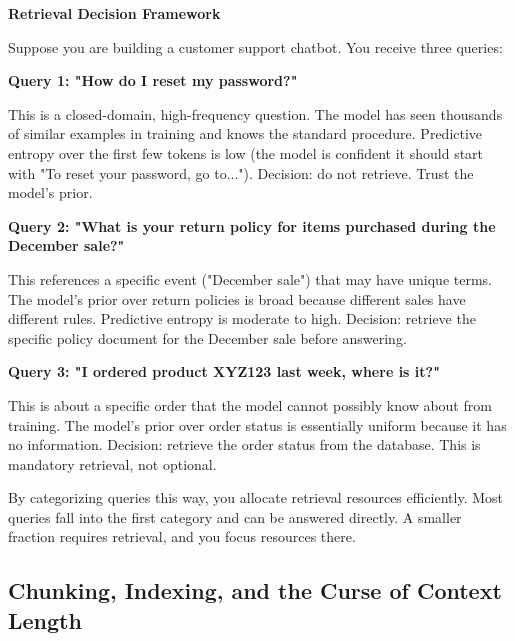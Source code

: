 \begin{examplebox}
\textbf{Retrieval Decision Framework}

\vspace{0.5em}

Suppose you are building a customer support chatbot. You receive three queries:

\vspace{0.5em}

\textbf{Query 1: "How do I reset my password?"}

This is a closed-domain, high-frequency question. The model has seen thousands of similar examples in training and knows the standard procedure. Predictive entropy over the first few tokens is low (the model is confident it should start with "To reset your password, go to..."). Decision: do not retrieve. Trust the model's prior.

\vspace{0.5em}

\textbf{Query 2: "What is your return policy for items purchased during the December sale?"}

This references a specific event ("December sale") that may have unique terms. The model's prior over return policies is broad because different sales have different rules. Predictive entropy is moderate to high. Decision: retrieve the specific policy document for the December sale before answering.

\vspace{0.5em}

\textbf{Query 3: "I ordered product XYZ123 last week, where is it?"}

This is about a specific order that the model cannot possibly know about from training. The model's prior over order status is essentially uniform because it has no information. Decision: retrieve the order status from the database. This is mandatory retrieval, not optional.

\vspace{0.5em}

By categorizing queries this way, you allocate retrieval resources efficiently. Most queries fall into the first category and can be answered directly. A smaller fraction requires retrieval, and you focus resources there.
\end{examplebox}

\vspace{1.5em}

\subsection{Chunking, Indexing, and the Curse of Context Length}

